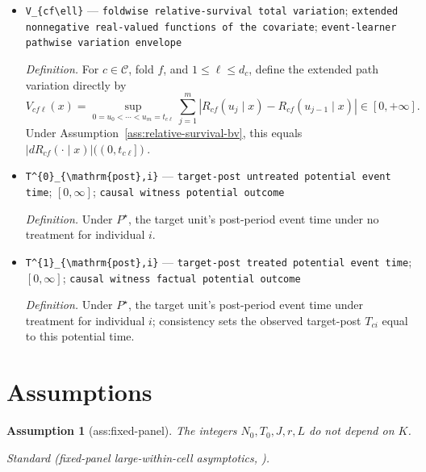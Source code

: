 \documentclass{article}
\newtheorem{assumption}{Assumption}
\begin{document}
\begin{itemize}
  \par\smallskip\noindent\emph{Definition.} For \(c\in\mathcal C\) and fold \(f\), define \[R_{cf}(u\mid x)=\frac{Q_c(u\mid x)}{\widehat Q_{c,-f}(u\mid x)}-1,\] using the existing convention \(0/0=1\).
  \item \texttt{V\_\allowbreak{}\{cf\textbackslash{}\allowbreak{}ell\}\allowbreak{}} --- \texttt{foldwise relative-\allowbreak{}survival total variation}; \texttt{extended nonnegative real-\allowbreak{}valued functions of the covariate}; \texttt{event-\allowbreak{}learner pathwise variation envelope}
  \par\smallskip\noindent\emph{Definition.} For \(c\in\mathcal C\), fold \(f\), and \(1\le\ell\le d_c\), define the extended path variation directly by \[V_{cf\ell}(x)=\sup_{0=u_0<\cdots<u_m=t_{c\ell}}\sum_{j=1}^m |R_{cf}(u_j\mid x)-R_{cf}(u_{j-1}\mid x)|\in[0,+\infty].\] Under Assumption~\ref{ass:relative-survival-bv}, this equals \(|dR_{cf}(\mathord\cdot\mid x)|((0,t_{c\ell}])\).
  \item \texttt{T\textasciicircum{}\{0\}\allowbreak{}\_\allowbreak{}\{\textbackslash{}\allowbreak{}mathrm\{post\}\allowbreak{},\allowbreak{}i\}\allowbreak{}} --- \texttt{target-\allowbreak{}post untreated potential event time}; \([0,\infty]\); \texttt{causal witness potential outcome}
  \par\smallskip\noindent\emph{Definition.} Under \(P^\star\), the target unit's post-period event time under no treatment for individual \(i\).
  \item \texttt{T\textasciicircum{}\{1\}\allowbreak{}\_\allowbreak{}\{\textbackslash{}\allowbreak{}mathrm\{post\}\allowbreak{},\allowbreak{}i\}\allowbreak{}} --- \texttt{target-\allowbreak{}post treated potential event time}; \([0,\infty]\); \texttt{causal witness factual potential outcome}
  \par\smallskip\noindent\emph{Definition.} Under \(P^\star\), the target unit's post-period event time under treatment for individual \(i\); consistency sets the observed target-post \(T_{ci}\) equal to this potential time.
\end{itemize}

\section{Assumptions}

\begin{assumption}[ass:fixed-panel]\label{ass:fixed-panel}
The integers \(N_0,T_0,J,r,L\) do not depend on \(K\).
\par\smallskip\noindent\emph{Standard} (fixed-panel large-within-cell asymptotics, \cite{HanShah2025SSC}).
\end{assumption}
\end{document}
